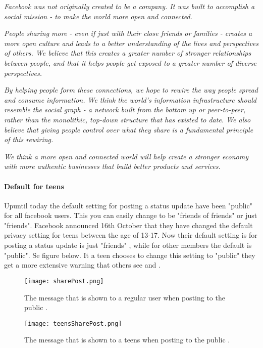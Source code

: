 \textit{Facebook was not originally created to be a company. It was built to accomplish a social mission - to make the world more open and connected.}

\textit{People sharing more - even if just with their close friends or families - creates a more open culture and leads to a better understanding of the lives and perspectives of others. We believe that this creates a greater number of stronger relationships between people, and that it helps people get exposed to a greater number of diverse perspectives.}

\textit{By helping people form these connections, we hope to rewire the way people spread and consume information. We think the world's information infrastructure should resemble the social graph - a network built from the bottom up or peer-to-peer, rather than the monolithic, top-down structure that has existed to date. We also believe that giving people control over what they share is a fundamental principle of this rewiring.}

\textit{We think a more open and connected world will help create a stronger economy with more authentic businesses that build better products and services.}



\paragraph{Default for teens}
 

Upuntil today the default setting for posting a status update have been "public" for all facebook users. This you can easily change to be "friends of friends" or just "friends".  Facebook announced 16th October that they have changed the default privacy setting for teens between the age of 13-17. Now their default setting is for posting a status update is just "friends" \cite{defaultTeens}, while for other members the default is "public". Se figure below. 
It a teen chooses to change this setting to "public" they get a more extensive warning that others see  and  . 


\begin{figure}[h!]
\label{fig:sharePost}
\centering
\texttt{[image: sharePost.png]}
\caption{The message that is shown to a regular user when posting to the public \cite{defaultTeens}.} 
\end{figure}

\begin{figure}[h!]
\label{fig:teensSharePost}
\centering
\texttt{[image: teensSharePost.png]}
\caption{The message that is shown to a teens when posting to the public \cite{defaultTeens}.} 
\end{figure}

